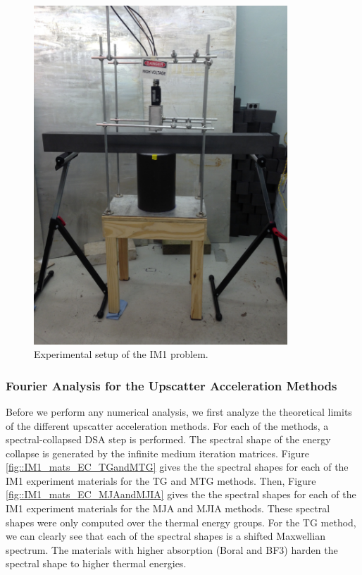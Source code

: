 \begin{figure}
\centering
\includegraphics[width=0.85\textwidth]{figures/sec_DSA/IM1_exp_setup.jpg}
\caption{Experimental setup of the IM1 problem.}
\label{fig::IM1_setup_3D}
\end{figure}




\subsubsection{Fourier Analysis for the Upscatter Acceleration Methods}
\label{sec::DSA_Results_IM1_Fourier}

Before we perform any numerical analysis, we first analyze the theoretical limits of the different upscatter acceleration methods. For each of the methods, a spectral-collapsed DSA step is performed. The spectral shape of the energy collapse is generated by the infinite medium iteration matrices. Figure \ref{fig::IM1_mats_EC_TGandMTG} gives the the spectral shapes for each of the IM1 experiment materials for the TG and MTG methods. Then, Figure \ref{fig::IM1_mats_EC_MJAandMJIA} gives the the spectral shapes for each of the IM1 experiment materials for the MJA and MJIA methods. These spectral shapes were only computed over the thermal energy groups. For the TG method, we can clearly see that each of the spectral shapes is a shifted Maxwellian spectrum. The materials with higher absorption (Boral and BF3) harden the spectral shape to higher thermal energies.

